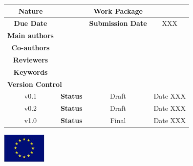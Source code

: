 	\bigskip
	\begin{center}
	\begin{tabular}{|c|c|c|c|}
	\hline
	\textbf{Nature} & \DeliverableNature & \textbf{Work Package} & \Workpackage \\ \hline

	\textbf{Due Date}  &  \DeliverableDueDate & \textbf{Submission Date}  & \DeliverableSubmissionDate XXX \\ \hline

	\textbf{Main authors}  & \multicolumn{3}{|l|}{\MainAuthor} \\ \hline

	\textbf{Co-authors} & \multicolumn{3}{|l|}{\mbox{ \CoAuthors }} \\ \hline

	\textbf{Reviewers}  & \multicolumn{3}{|l|}{\Reviewers}  \\ \hline
 
	\textbf{Keywords}  & \multicolumn{3}{|l|}{\Keywords}\\ \hline
	
	\multicolumn{4}{|l|}{\textbf{Version Control}}\\ \hline
	
	v0.1 & \textbf{Status} & Draft & Date XXX \\ \hline
	v0.2 & \textbf{Status} & Draft & Date XXX \\ \hline
	v1.0 & \textbf{Status} & Final & Date XXX \\ \hline
	\end{tabular}
	\end{center}


\vfill
\centerline{\includegraphics[height=1.5cm]{./images/EU_flag.jpg}}


\clearpage